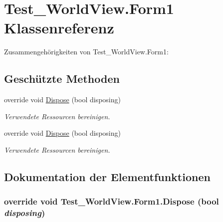 \hypertarget{class_test___world_view_1_1_form1}{
\section{Test\_\-WorldView.Form1 Klassenreferenz}
\label{class_test___world_view_1_1_form1}
}


Zusammengehörigkeiten von Test\_\-WorldView.Form1:\subsection*{Geschützte Methoden}
\begin{DoxyCompactItemize}
\item 
override void \hyperlink{class_test___world_view_1_1_form1_aeb423a166a4e2a2273b5b825f12ecc2d}{Dispose} (bool disposing)
\begin{DoxyCompactList}\small\item\em Verwendete Ressourcen bereinigen. \item\end{DoxyCompactList}\item 
override void \hyperlink{class_test___world_view_1_1_form1_aeb423a166a4e2a2273b5b825f12ecc2d}{Dispose} (bool disposing)
\begin{DoxyCompactList}\small\item\em Verwendete Ressourcen bereinigen. \item\end{DoxyCompactList}\end{DoxyCompactItemize}


\subsection{Dokumentation der Elementfunktionen}
\hypertarget{class_test___world_view_1_1_form1_aeb423a166a4e2a2273b5b825f12ecc2d}{
\subsubsection[{Dispose}]{\setlength{\rightskip}{0pt plus 5cm}override void Test\_\-WorldView.Form1.Dispose (bool {\em disposing})}}
\label{class_test___world_view_1_1_form1_aeb423a166a4e2a2273b5b825f12ecc2d}



